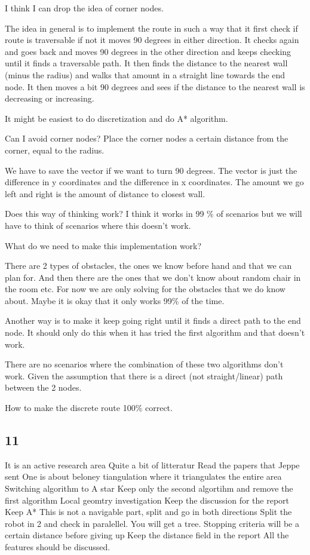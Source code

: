 I think I can drop the idea of corner nodes.

The idea in general is to implement the route in such a way that it first check if route is traversable if not it moves 90 degrees in either direction. It checks again and goes back and moves 90 degrees in the other direction and keeps checking until it finds a traversable path. It then finds the distance to the nearest wall (minus the radius) and walks that amount in a straight line towards the end node. It then moves a bit 90 degrees and sees if the distance to the nearest wall is decreasing or increasing.

It might be easiest to do discretization and do A* algorithm.


Can I avoid corner nodes?
Place the corner nodes a certain distance from the corner, equal to the radius.

We have to save the vector if we want to turn 90 degrees.
The vector is just the difference in y coordinates and the difference in x coordinates.
The amount we go left and right is the amount of distance to closest wall.

Does this way of thinking work?
I think it works in 99 \% of scenarios but we will have to think of scenarios where this doesn't work.

What do we need to make this implementation work?

There are 2 types of obstacles, the ones we know before hand and that we can plan for.
And then there are the ones that we don't know about random chair in the room etc.
For now we are only solving for the obstacles that we do know about.
Maybe it is okay that it only works 99\% of the time.

Another way is to make it keep going right until it finds a direct path to the end node.
It should only do this when it has tried the first algorithm and that doesn't work.

There are no scenarios where the combination of these two algorithms don't work.
Given the assumption that there is a direct (not straight/linear) path between the 2 nodes.

How to make the discrete route 100\% correct.

\subsection{11}
It is an active research area
Quite a bit of litteratur 
Read  the papers that Jeppe sent
One is about beloney tiangulation where it triangulates the entire area
Switching algorithm to A star
Keep only the second algortihm and remove the first algorithm
Local geomtry investigation
Keep the discussion for the report
Keep A*
This is not a navigable part, split and go in both directions
Split the robot in 2 and check in paralellel. You will get a tree.
Stopping criteria  will be a certain distance before giving up
Keep the distance field in the report
All the features should be discussed. 

